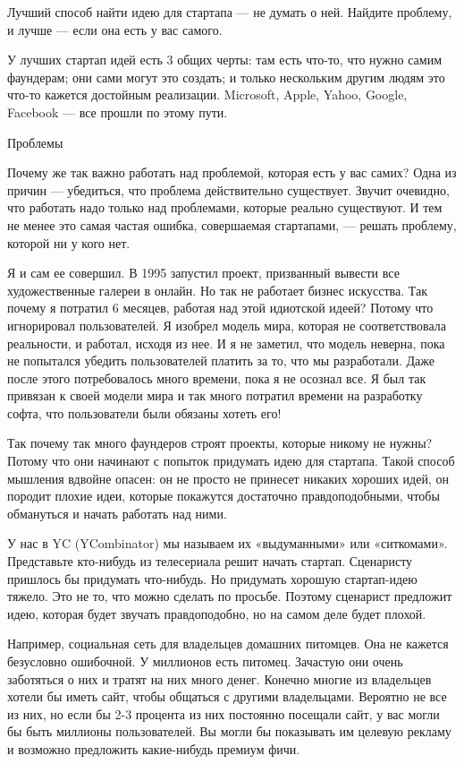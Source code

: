 \documentclass[ebook,12pt,oneside,openany]{memoir}
\date{}
\begin{document}
\maketitle

Лучший способ найти идею для стартапа — не думать о ней. Найдите
проблему, и лучше — если она есть у вас самого.


У лучших стартап идей есть 3 общих черты: там есть что-то, что нужно
самим фаундерам; они сами могут это создать; и только нескольким
другим людям это что-то кажется достойным реализации. Microsoft,
Apple, Yahoo, Google, Facebook — все прошли по этому пути.

Проблемы

Почему же так важно работать над проблемой, которая есть у вас самих?
Одна из причин — убедиться, что проблема действительно существует.
Звучит очевидно, что работать надо только над проблемами, которые
реально существуют. И тем не менее это самая частая ошибка,
совершаемая стартапами, — решать проблему, которой ни у кого нет.

Я и сам ее совершил. В 1995 запустил проект, призванный вывести все
художественные галереи в онлайн. Но так не работает бизнес искусства.
Так почему я потратил 6 месяцев, работая над этой идиотской идеей?
Потому что игнорировал пользователей. Я изобрел модель мира, которая
не соответствовала реальности, и работал, исходя из нее. И я не
заметил, что модель неверна, пока не попытался убедить пользователей
платить за то, что мы разработали. Даже после этого потребовалось
много времени, пока я не осознал все. Я был так привязан к своей
модели мира и так много потратил времени на разработку софта, что
пользователи были обязаны хотеть его!

Так почему так много фаундеров строят проекты, которые никому не
нужны? Потому что они начинают с попыток придумать идею для стартапа.
Такой способ мышления вдвойне опасен: он не просто не принесет никаких
хороших идей, он породит плохие идеи, которые покажутся достаточно
правдоподобными, чтобы обмануться и начать работать над ними.

У нас в YC (YCombinator) мы называем их «выдуманными» или «ситкомами».
Представьте кто-нибудь из телесериала решит начать стартап. Сценаристу
пришлось бы придумать что-нибудь. Но придумать хорошую стартап-идею
тяжело. Это не то, что можно сделать по просьбе. Поэтому сценарист
предложит идею, которая будет звучать правдоподобно, но на самом деле
будет плохой.

Например, социальная сеть для владельцев домашних питомцев. Она не
кажется безусловно ошибочной. У миллионов есть питомец. Зачастую они
очень заботяться о них и тратят на них много денег. Конечно многие из
владельцев хотели бы иметь сайт, чтобы общаться с другими владельцами.
Вероятно не все из них, но если бы 2-3 процента из них постоянно
посещали сайт, у вас могли бы быть миллионы пользователей. Вы могли бы
показывать им целевую рекламу и возможно предложить какие-нибудь
премиум фичи.
\end{document}
